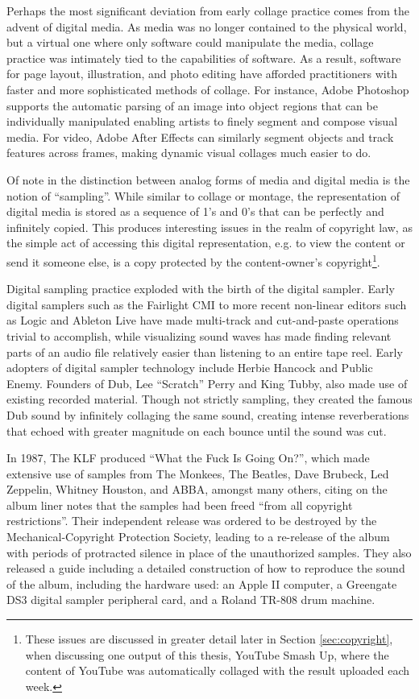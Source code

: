 Perhaps the most significant deviation from early collage practice comes from the advent of digital media.  As media was no longer contained to the physical world, but a virtual one where only software could manipulate the media, collage practice was intimately tied to the capabilities of software.  As a result, software for page layout, illustration, and photo editing have afforded practitioners with faster and more sophisticated methods of collage.  For instance, Adobe Photoshop supports the automatic parsing of an image into object regions that can be individually manipulated enabling artists to finely segment and compose visual media.  For video, Adobe After Effects can similarly segment objects and track features across frames, making dynamic visual collages much easier to do.  

Of note in the distinction between analog forms of media and digital media is the notion of ``sampling''.  While similar to collage or montage, the representation of digital media is stored as a sequence of 1's and 0's that can be perfectly and infinitely copied.  This produces interesting issues in the realm of copyright law, as the simple act of accessing this digital representation, e.g. to view the content or send it someone else, is a copy protected by the content-owner's copyright\footnote{These issues are discussed in greater detail later in Section \ref{sec:copyright}, when discussing one output of this thesis, YouTube Smash Up, where the content of YouTube was automatically collaged with the result uploaded each week.}.  

Digital sampling practice exploded with the birth of the digital sampler.  Early digital samplers such as the Fairlight CMI to more recent non-linear editors such as Logic and Ableton Live have made multi-track and cut-and-paste operations trivial to accomplish, while visualizing sound waves has made finding relevant parts of an audio file relatively easier than listening to an entire tape reel.  Early adopters of digital sampler technology include Herbie Hancock and Public Enemy.  Founders of Dub, Lee ``Scratch'' Perry and King Tubby, also made use of existing recorded material.  Though not strictly sampling, they created the famous Dub sound by infinitely collaging the same sound, creating intense reverberations that echoed with greater magnitude on each bounce until the sound was cut.  

In 1987, The KLF produced ``What the Fuck Is Going On?'', which made extensive use of samples from The Monkees, The Beatles, Dave Brubeck, Led Zeppelin, Whitney Houston, and ABBA, amongst many others, citing on the album liner notes that the samples had been freed ``from all copyright restrictions''.  Their independent release was ordered to be destroyed by the Mechanical-Copyright Protection Society, leading to a re-release of the album with periods of protracted silence in place of the unauthorized samples.  They also released a guide including a detailed construction of how to reproduce the sound of the album, including the hardware used: an Apple II computer, a Greengate DS3 digital sampler peripheral card, and a Roland TR-808 drum machine.  

